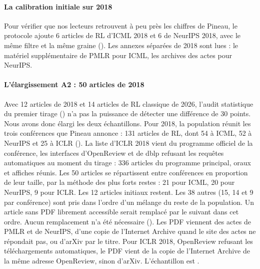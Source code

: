 \paragraph{La calibration initiale sur 2018}
Pour vérifier que nos lecteurs retrouvent à peu près les chiffres de Pineau, le protocole ajoute 6
articles de RL d'ICML 2018 et 6 de NeurIPS 2018, avec le même filtre et la même graine
(). Les annexes séparées de 2018 sont lues : le matériel supplémentaire
de PMLR pour ICML, les archives des actes pour NeurIPS.

\paragraph{L'élargissement A2 : 50 articles de 2018}
Avec 12 articles de 2018 et 14 articles de RL classique de 2026, l'audit statistique du premier tirage
() n'a pas la puissance de détecter une différence de 30 points. Nous
avons donc élargi les deux échantillons. Pour 2018,
la population réunit les trois conférences que Pineau annonce : 131 articles de RL, dont 54 à ICML, 52
à NeurIPS et 25 à ICLR (). La liste d'ICLR 2018 vient du
programme officiel de la conférence, les interfaces d'OpenReview et de dblp refusant les requêtes
automatiques au moment du tirage : 336 articles du programme principal, oraux et affiches réunis. Les
50 articles se répartissent entre conférences en proportion de leur taille, par la méthode des plus
forts restes : 21 pour ICML, 20 pour NeurIPS, 9 pour ICLR. Les 12 articles initiaux restent. Les 38
autres (15, 14 et 9 par conférence) sont pris dans l'ordre d'un mélange  du
reste de la population. Un article sans PDF librement accessible serait remplacé par le suivant dans
cet ordre. Aucun remplacement n'a été nécessaire (). Les PDF
viennent des actes de PMLR et de NeurIPS, d'une copie de l'Internet Archive quand le site des actes ne
répondait pas, ou d'arXiv par le titre. Pour ICLR 2018, OpenReview refusant les téléchargements
automatiques, le PDF vient de la copie de l'Internet Archive de la même adresse OpenReview, sinon
d'arXiv. L'échantillon est .

